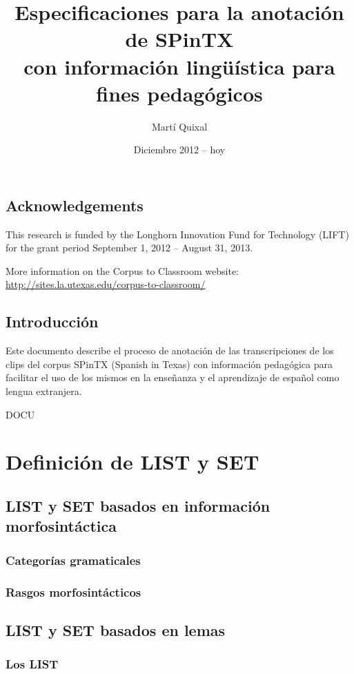\documentclass[11pt]{report}
\begin{document}
\title{Especificaciones para la anotación de SPinTX\\ con información lingüística para fines pedagógicos}
\author{Martí Quixal}
\date{Diciembre 2012 -- hoy}
\maketitle
\tableofcontents

\cleardoublepage

\chapter*{Acknowledgements}
This research is funded by the Longhorn Innovation Fund for Technology (LIFT) for the grant period September 1, 2012 – August 31, 2013.

More information on the Corpus to Classroom website:\\
\url{http://sites.la.utexas.edu/corpus-to-classroom/}

\chapter*{Introducción}
Este documento describe el proceso de anotación de las transcripciones de los clips del corpus SPinTX (Spanish in Texas) con información pedagógica para facilitar el uso de los mismos en la enseñanza y el aprendizaje de español como lengua extranjera.

DOCU
\part{Definición de LIST y SET}
\chapter{LIST y SET basados en información morfosintáctica}
\section{Categorías gramaticales}
\section{Rasgos morfosintácticos}
\chapter{LIST y SET basados en lemas}
\section{Los LIST}
\end{document}
